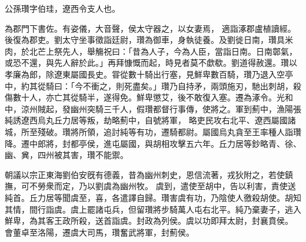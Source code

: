 \begin{pinyinscope}
 
 
 公孫瓚字伯珪，遼西令支人也。
 
 
 為郡門下書佐。有姿儀，大音聲，侯太守器之，以女妻焉，
 適詣涿郡盧植讀經。後復為郡吏。劉太守坐事徵詣廷尉，瓚為御車，身執徒養。及劉徙日南，瓚具米肉，於北芒上祭先人，舉觴祝曰：「昔為人子，今為人臣，當詣日南。日南鄣氣，或恐不還，與先人辭於此。」再拜慷慨而起，時見者莫不歔欷。劉道得赦還。瓚以孝廉為郎，除遼東屬國長史。甞從數十騎出行塞，見鮮卑數百騎，瓚乃退入空亭中，約其從騎曰：「今不衝之，則死盡矣。」瓚乃自持矛，兩頭施刃，馳出刺胡，殺傷數十人，亦亡其從騎半，遂得免。鮮卑懲艾，後不敢復入塞。遷為涿令。光和中，涼州賊起，發幽州突騎三千人，假瓚都督行事傳，使將之。軍到薊中，漁陽張純誘遼西烏丸丘力居等叛，劫略薊中，自號將軍，
 略吏民攻右北平、遼西屬國諸城，所至殘破。瓚將所領，追討純等有功，遷騎都尉。屬國烏丸貪至王率種人詣瓚降。遷中郎將，封都亭侯，進屯屬國，與胡相攻擊五六年。丘力居等鈔略青、徐、幽、兾，四州被其害，瓚不能禦。
 
 
朝議以宗正東海劉伯安旣有德義，昔為幽州刺史，恩信流著，戎狄附之，若使鎮撫，可不勞衆而定，乃以劉虞為幽州牧。
 虞到，遣使至胡中，告以利害，責使送純首。丘力居等聞虞至，喜，各遣譯自歸。瓚害虞有功，乃陰使人徼殺胡使。胡知其情，間行詣虞。虞上罷諸屯兵，但留瓚將步騎萬人屯右北平。純乃棄妻子，逃入鮮卑，為其客王政所殺，送首詣虞。封政為列侯。虞以功即拜太尉，封襄賁侯。
 會董卓至洛陽，遷虞大司馬，瓚奮武將軍，封薊侯。
 

\end{pinyinscope}
